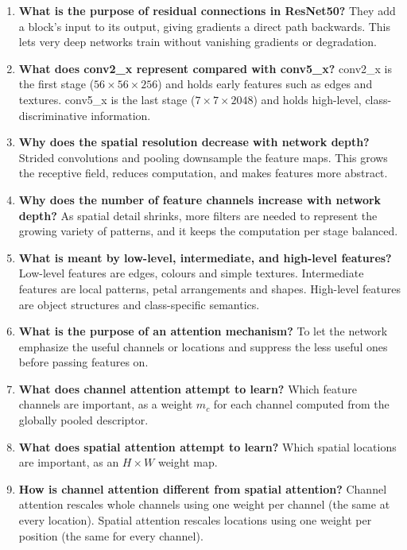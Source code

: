 \documentclass[11pt]{article}
\begin{document}
\begin{enumerate}
\item \textbf{What is the purpose of residual connections in ResNet50?}
They add a block's input to its output, giving gradients a direct path
backwards. This lets very deep networks train without vanishing gradients
or degradation.

\item \textbf{What does conv2\_x represent compared with conv5\_x?}
conv2\_x is the first stage ($56\times56\times256$) and holds early
features such as edges and textures. conv5\_x is the last stage
($7\times7\times2048$) and holds high-level, class-discriminative
information.

\item \textbf{Why does the spatial resolution decrease with network depth?}
Strided convolutions and pooling downsample the feature maps. This grows
the receptive field, reduces computation, and makes features more abstract.

\item \textbf{Why does the number of feature channels increase with network depth?}
As spatial detail shrinks, more filters are needed to represent the growing
variety of patterns, and it keeps the computation per stage balanced.

\item \textbf{What is meant by low-level, intermediate, and high-level features?}
Low-level features are edges, colours and simple textures. Intermediate
features are local patterns, petal arrangements and shapes. High-level
features are object structures and class-specific semantics.

\item \textbf{What is the purpose of an attention mechanism?}
To let the network emphasize the useful channels or locations and
suppress the less useful ones before passing features on.

\item \textbf{What does channel attention attempt to learn?}
Which feature channels are important, as a weight $m_c$ for each channel
computed from the globally pooled descriptor.

\item \textbf{What does spatial attention attempt to learn?}
Which spatial locations are important, as an $H\times W$ weight map.

\item \textbf{How is channel attention different from spatial attention?}
Channel attention rescales whole channels using one weight per channel
(the same at every location). Spatial attention rescales locations using one
weight per position (the same for every channel).


\end{enumerate}
\end{document}
